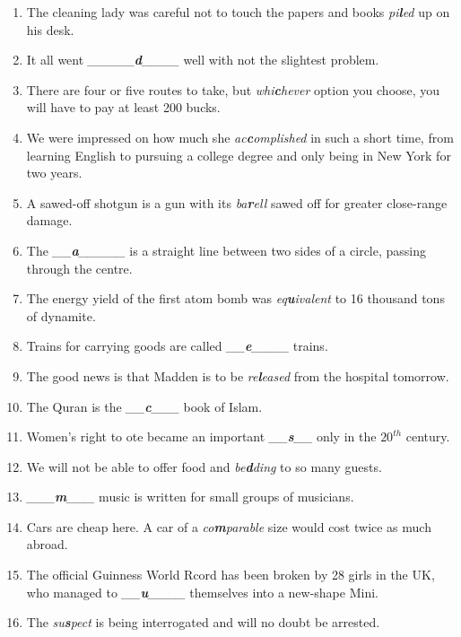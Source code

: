 \documentclass[a4paper]{article}
\begin{document}
\begin{enumerate}
    \item The cleaning lady was careful not to touch the papers and books \emph{pi{\bf l}ed} up on his desk.
    \item It all went \emph{\_\_\_\_\_{\bf d}\_\_\_\_} well with not the slightest problem.
    \item There are four or five routes to take, but \emph{whi{\bf c}hever} option you choose, you will have to pay at least 200 bucks.
    \item We were impressed on how much she \emph{ac{\bf c}omplished} in such a short time, from learning English to pursuing a college degree and only being in New York for two years.
    \item A sawed-off shotgun is a gun with its \emph{ba{\bf r}ell} sawed off for greater close-range damage.
    \item The \emph{\_\_{\bf a}\_\_\_\_\_} is a straight line between two sides of a circle, passing through the centre.
    \item The energy yield of the first atom bomb was \emph{eq{\bf u}ivalent} to 16 thousand tons of dynamite.
    \item Trains for carrying goods are called \emph{\_\_{\bf e}\_\_\_\_} trains.
    \item The good news is that Madden is to be \emph{re{\bf l}eased} from the hospital tomorrow.
    \item The Quran is the \emph{\_\_{\bf c}\_\_\_} book of Islam.
    \item Women's right to ote became an important \emph{\_\_{\bf s}\_\_} only in the $20^{th}$ century.
    \item We will not be able to offer food and \emph{be{\bf d}ding} to so many guests.
    \item \emph{\_\_\_{\bf m}\_\_\_} music is written for small groups of musicians.
    \item Cars are cheap here. A car of a \emph{co{\bf m}parable} size would cost twice as much abroad.
    \item The official Guinness World Rcord has been broken by 28 girls in the UK, who managed to \emph{\_\_{\bf u}\_\_\_\_} themselves into a new-shape Mini.
    \item The \emph{su{\bf s}pect} is being interrogated and will no doubt be arrested.
\end{enumerate}
\end{document}
